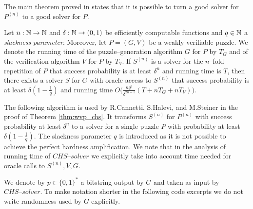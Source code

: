 The main theorem proved in \cite{canetti2004hardness} states that it is possible to turn a good solver for $P^{(n)}$ to a good solver for $P$.
%
\begin{theorem}
  \label{thm:wvp_chs}
Let $n:\mathbb{N} \rightarrow \mathbb{N}$ and $\delta: \mathbb{N} \rightarrow (0,1)$ be efficiently computable functions and $q \in \mathbb{N}$ a \textit{slackness parameter}.
Moreover, let $P = (G,V)$ be a weakly verifiable puzzle. We denote the running time of the
puzzle--generation algorithm $G$ for $P$ by $T_G$ and of the verification algorithm $V$ for $P$ by $T_V$.
If $S^{(n)}$ is a solver for the $n$--fold repetition of $P$ that success probability is at least $\delta^{n}$
and running time is $T$, then there exists a solver $S$ for $G$ with oracle access to $S^{(n)}$ that success
probability is at least $\delta(1-\frac{1}{q})$ and running time $O\Big(\frac{nq^3}{\delta^{2n-1}}(T + nT_G + nT_V)\Big)$.
\end{theorem}
%
The following algorithm is used by R.Cannetti, S.Halevi, and M.Steiner in the proof of Theorem \ref{thm:wvp_chs}.
It transforms $S^{(n)}$ for $P^{(n)}$ with success probability at least $\delta^{n}$ to a solver for a single puzzle $P$ with probability
at least $\delta(1  - \frac{1}{q})$. The slackness parameter $q$ is introduced as it is not possible to achieve
the perfect hardness amplification. We note that in the analysis of running time of $\mathit{CHS\text{--}solver}$
we explicitly take into account time needed for oracle calls to $S^{(n)}, V, G$.

We denote by $p \in \{0,1\}^{*}$ a bitstring output by $G$ and taken as input by $\mathit{CHS\text{--}solver}$.
To make notation shorter in the following code excerpts we do not write randomness used by $G$ explicitly.

